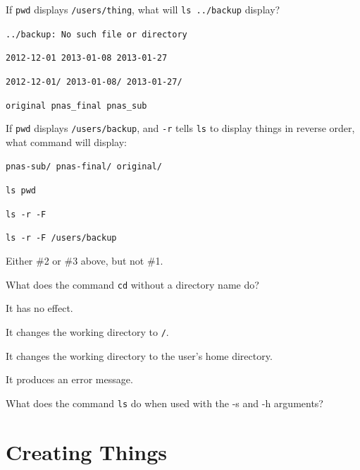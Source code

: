 \documentclass{book}
\begin{document}
\begin{swcenumerate}
\item
  If \texttt{pwd} displays \texttt{/users/thing}, what will
  \texttt{ls ../backup} display?

  \begin{swcenumerate2}
  \item
    \texttt{../backup: No such file or directory}
  \item
    \texttt{2012-12-01 2013-01-08 2013-01-27}
  \item
    \texttt{2012-12-01/ 2013-01-08/ 2013-01-27/}
  \item
    \texttt{original pnas\_final pnas\_sub}
  \end{swcenumerate2}
\item
  If \texttt{pwd} displays \texttt{/users/backup}, and \texttt{-r} tells
  \texttt{ls} to display things in reverse order, what command will
  display:

\begin{verbatim}
pnas-sub/ pnas-final/ original/
\end{verbatim}

  \begin{swcenumerate2}
  \item
    \texttt{ls pwd}
  \item
    \texttt{ls -r -F}
  \item
    \texttt{ls -r -F /users/backup}
  \item
    Either \#2 or \#3 above, but not \#1.
  \end{swcenumerate2}
\item
  What does the command \texttt{cd} without a directory name do?

  \begin{swcenumerate2}
  \item
    It has no effect.
  \item
    It changes the working directory to \texttt{/}.
  \item
    It changes the working directory to the user's home directory.
  \item
    It produces an error message.
  \end{swcenumerate2}
\item
  What does the command \texttt{ls} do when used with the -s and -h
  arguments?
\end{swcenumerate}

\section{Creating Things}
\end{document}
